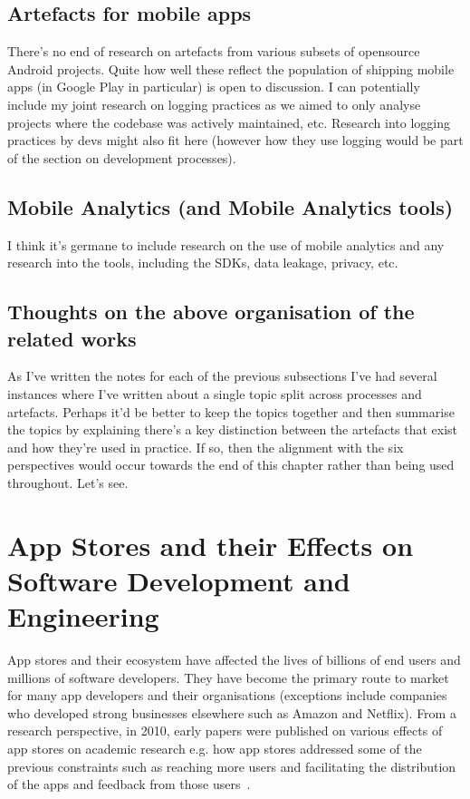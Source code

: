 \subsection*{Artefacts for mobile apps}
There's no end of research on artefacts from various subsets of opensource Android projects. Quite how well these reflect the population of shipping mobile apps (in Google Play in particular) is open to discussion. I can potentially include my joint research on logging practices as we aimed to only analyse projects where the codebase was actively maintained, etc. Research into logging practices by devs might also fit here (however how they use logging would be part of the section on development processes).

\subsection*{Mobile Analytics (and Mobile Analytics tools)}
I think it's germane to include research on the use of mobile analytics and any research into the tools, including the SDKs, data leakage, privacy, etc.

\subsection*{Thoughts on the above organisation of the related works}
As I've written the notes for each of the previous subsections I've had several instances where I've written about a single topic split across processes and artefacts. Perhaps it'd be better to keep the topics together and then summarise the topics by explaining there's a key distinction between the artefacts that exist and how they're used in practice. If so, then the alignment with the six perspectives would occur towards the end of this chapter rather than being used throughout. Let's see.


\section{App Stores and their Effects on Software Development and Engineering}
App stores and their ecosystem have affected the lives of billions of end users and millions of software developers. They have become the primary route to market for many app developers and their organisations (exceptions include companies who developed strong businesses elsewhere such as Amazon and Netflix). 
From a research perspective, in 2010, early papers were published on various effects of app stores on academic research e.g. how app stores addressed some of the previous constraints such as reaching more users and facilitating the distribution of the apps and feedback from those users~\cite{cramer2010_research_in_the_large_app_stores, miluzzo2010research_in_the_app_store_era}. 

